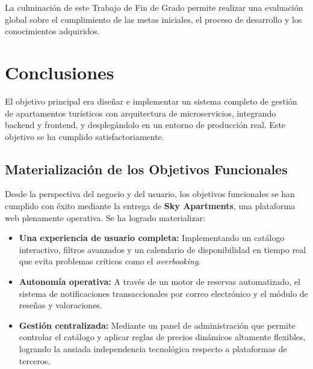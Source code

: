 La culminación de este Trabajo de Fin de Grado permite realizar una evaluación global sobre el cumplimiento de las metas iniciales, el proceso de desarrollo y los conocimientos adquiridos.
\section{Conclusiones}
El objetivo principal era diseñar e implementar un sistema completo de gestión de apartamentos turísticos con arquitectura de microservicios, integrando backend y frontend, y desplegándolo en un entorno de producción real. Este objetivo se ha cumplido satisfactoriamente.
\subsection{Materialización de los Objetivos Funcionales}
Desde la perspectiva del negocio y del usuario, los objetivos funcionales se han cumplido con éxito mediante la entrega de \textbf{Sky Apartments}, una plataforma web plenamente operativa. Se ha logrado materializar:
\begin{itemize}
    \item \textbf{Una experiencia de usuario completa:} Implementando un catálogo interactivo, filtros avanzados y un calendario de disponibilidad en tiempo real que evita problemas críticos como el \textit{overbooking}.
    \item \textbf{Autonomía operativa:} A través de un motor de reservas automatizado, el sistema de notificaciones transaccionales por correo electrónico y el módulo de reseñas y valoraciones.
    \item \textbf{Gestión centralizada:} Mediante un panel de administración que permite controlar el catálogo y aplicar reglas de precios dinámicos altamente flexibles, logrando la ansiada independencia tecnológica respecto a plataformas de terceros.
\end{itemize}

